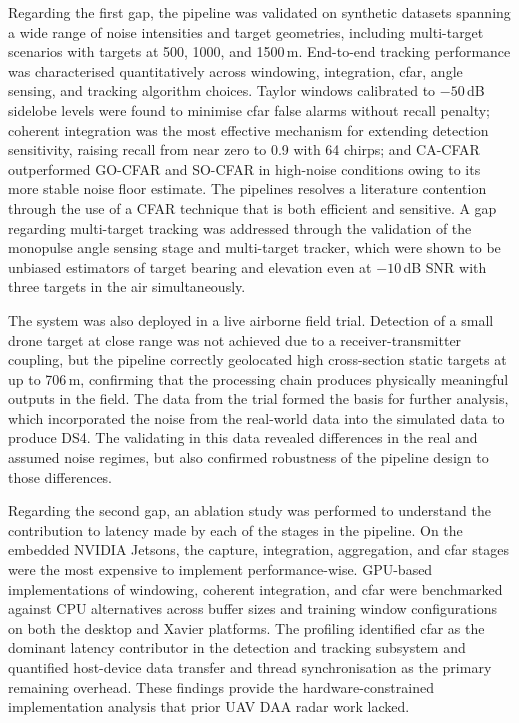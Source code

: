 Regarding the first gap, the pipeline was validated on synthetic datasets spanning a wide
range of noise intensities and target geometries, including multi-target scenarios with
targets at 500, 1000, and 1500\,m. End-to-end tracking performance was characterised
quantitatively across windowing, integration, \gls{cfar}, angle sensing, and tracking
algorithm choices. Taylor windows calibrated to $-50$\,dB sidelobe levels were found to
minimise \gls{cfar} false alarms without recall penalty; coherent integration was the most
effective mechanism for extending detection sensitivity, raising recall from near zero to
0.9 with 64 chirps; and CA-CFAR outperformed GO-CFAR and SO-CFAR in high-noise conditions
owing to its more stable noise floor estimate. The pipelines resolves a literature contention 
through the use of a CFAR technique that is both efficient and sensitive. A gap regarding
multi-target tracking was addressed through the validation of the monopulse angle sensing stage and
multi-target tracker, which were shown to be unbiased estimators of target bearing and elevation even at
$-10$\,dB SNR with three targets in the air simultaneously. 

The system was also deployed in a live
airborne field trial. Detection of a small drone target at close range was not achieved
due to a receiver-transmitter coupling, but the pipeline correctly geolocated high cross-section
static targets at up to 706\,m, confirming that the processing chain produces physically
meaningful outputs in the field. The data from the trial formed the basis for further analysis, 
which incorporated the noise from the real-world data into the simulated data to produce DS4. 
The validating in this data revealed differences in the real and assumed noise regimes, but also
confirmed robustness of the pipeline design to those differences. 

Regarding the second gap, an ablation study was performed to understand the contribution 
to latency made by each of the stages in the pipeline. On the embedded NVIDIA Jetsons, the 
capture, integration, aggregation, and cfar stages were the most expensive to implement performance-wise.
GPU-based implementations of windowing, coherent integration,
and \gls{cfar} were benchmarked against CPU alternatives across buffer sizes and training
window configurations on both the desktop and Xavier platforms. The profiling identified
\gls{cfar} as the dominant latency contributor in the detection and tracking subsystem 
and quantified
host-device data transfer and thread synchronisation as the primary remaining overhead. 
These findings provide the hardware-constrained implementation analysis that prior UAV DAA 
radar work lacked.

